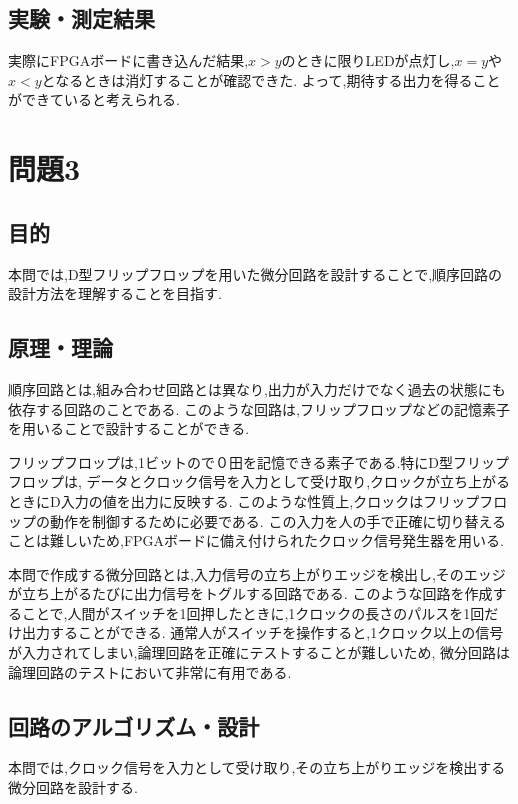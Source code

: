 \documentclass[autodetect-engine, dvi=dvipdfmx, 10pt, a4paper, ja=standard]{bxjsarticle}
\begin{document}
\subsection{実験・測定結果}

実際にFPGAボードに書き込んだ結果,$x > y$のときに限りLEDが点灯し,$x = y$や$x < y$となるときは消灯することが確認できた.
よって,期待する出力を得ることができていると考えられる.

\section{問題3}

\subsection{目的}
本問では,D型フリップフロップを用いた微分回路を設計することで,順序回路の設計方法を理解することを目指す.

\subsection{原理・理論}
順序回路とは,組み合わせ回路とは異なり,出力が入力だけでなく過去の状態にも依存する回路のことである.
このような回路は,フリップフロップなどの記憶素子を用いることで設計することができる.

フリップフロップは,1ビットので０田を記憶できる素子である.特にD型フリップフロップは,
データとクロック信号を入力として受け取り,クロックが立ち上がるときにD入力の値を出力に反映する.
このような性質上,クロックはフリップフロップの動作を制御するために必要である.
この入力を人の手で正確に切り替えることは難しいため,FPGAボードに備え付けられたクロック信号発生器を用いる.

本問で作成する微分回路とは,入力信号の立ち上がりエッジを検出し,そのエッジが立ち上がるたびに出力信号をトグルする回路である.
このような回路を作成することで,人間がスイッチを1回押したときに,1クロックの長さのパルスを1回だけ出力することができる.
通常人がスイッチを操作すると,1クロック以上の信号が入力されてしまい,論理回路を正確にテストすることが難しいため,
微分回路は論理回路のテストにおいて非常に有用である.

\subsection{回路のアルゴリズム・設計}

本問では,クロック信号を入力として受け取り,その立ち上がりエッジを検出する微分回路を設計する.
\end{document}
